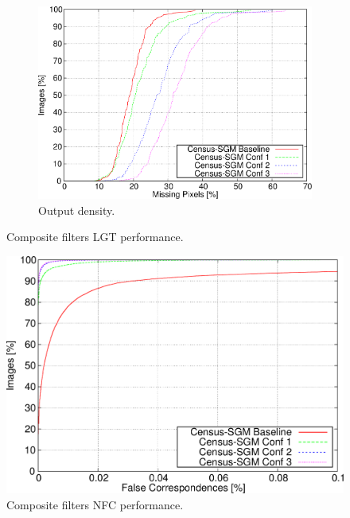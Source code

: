 \begin{figure}[p]
  \ContinuedFloat
  \begin{subfigure}[h]{\textwidth}
    \centering
    \includegraphics[width=\textwidth, height=0.4\textheight, trim=0 0 0 0,clip]{comp_dens}
    \caption{ Output density. }
    \label{fig:cp03_composite_LGT_dens}
  \end{subfigure}%
  \caption{ Composite filters LGT performance. }
\end{figure}

\begin{figure}[p]
  \centering
  \includegraphics[width=\textwidth, height=0.4\textheight, trim=0 0 0 0,clip]{comp_nfc_perc}
  \caption{ Composite filters NFC performance.}
  \label{fig:cp03_composite_NFC}
\end{figure}%

